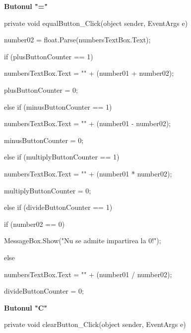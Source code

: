 	\textbf{Butonul "="}
	
	private void equalButton_Click(object sender, EventArgs e)
        
        {
            number02 = float.Parse(numbersTextBox.Text);
            
            if (plusButtonCounter == 1)
            
            { 
                numbersTextBox.Text = "" + (number01 + number02);
                
                plusButtonCounter = 0;
                
            }
           
            else if (minusButtonCounter == 1)
            {
                
                numbersTextBox.Text = "" + (number01 - number02);
               
                minusButtonCounter = 0;
                
            }
            
            else if (multiplyButtonCounter == 1)
            
            {
               
                numbersTextBox.Text = "" + (number01 * number02);
               
                multiplyButtonCounter = 0;
                
            }
            
            else if (divideButtonCounter == 1)
            
            {
                
                if (number02 == 0)
                
                {
                    
                    MessageBox.Show("Nu se admite impartirea la 0!");
                    
                }
                
                else
                
                {
                    
                    numbersTextBox.Text = "" + (number01 / number02);
                  
                    divideButtonCounter = 0;
                }
            }
        }
   
   \textbf{Butonul "C"}
   
  private void clearButton_Click(object sender, EventArgs e)
        
